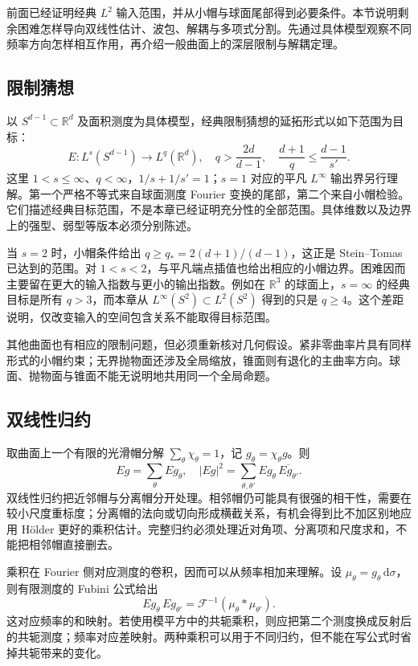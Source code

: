 
前面已经证明经典 \(L^2\) 输入范围，并从小帽与球面尾部得到必要条件。本节说明剩余困难怎样导向双线性估计、波包、解耦与多项式分割。先通过具体模型观察不同频率方向怎样相互作用，再介绍一般曲面上的深层限制与解耦定理。

\subsection{限制猜想}
\label{b2:subsec:230601}

以 \(S^{d-1}\subset\mathbb R^d\) 及面积测度为具体模型，经典限制猜想的延拓形式以如下范围为目标：
\[
 E:L^s(S^{d-1})\longrightarrow L^q(\mathbb R^d),\quad
 q>\frac{2d}{d-1},\quad
 \frac{d+1}{q}\leq\frac{d-1}{s'}.
\]
这里 \(1<s\leq\infty\)、\(q<\infty\)，\(1/s+1/s'=1\)；\(s=1\) 对应的平凡 \(L^\infty\) 输出界另行理解。第一个严格不等式来自球面测度 Fourier 变换的尾部，第二个来自小帽检验。它们描述经典目标范围，不是本章已经证明充分性的全部范围。具体维数以及边界上的强型、弱型等版本必须分别陈述。

\ProseParagraphBreak
当 \(s=2\) 时，小帽条件给出 \(q\geq q_*=2(d+1)/(d-1)\)，这正是 Stein--Tomas 已达到的范围。对 \(1<s<2\)，与平凡端点插值也给出相应的小帽边界。困难因而主要留在更大的输入指数与更小的输出指数。例如在 \(\mathbb R^3\) 的球面上，\(s=\infty\) 的经典目标是所有 \(q>3\)，而本章从 \(L^\infty(S^2)\subset L^2(S^2)\) 得到的只是 \(q\geq4\)。这个差距说明，仅改变输入的空间包含关系不能取得目标范围。

其他曲面也有相应的限制问题，但必须重新核对几何假设。紧非零曲率片具有同样形式的小帽约束；无界抛物面还涉及全局缩放，锥面则有退化的主曲率方向。球面、抛物面与锥面不能无说明地共用同一个全局命题。

\subsection{双线性归约}
\label{b2:subsec:230602}

取曲面上一个有限的光滑帽分解 \(\sum_\theta\chi_\theta=1\)，记 \(g_\theta=\chi_\theta g\)。则
\[
 Eg=\sum_\theta Eg_\theta,\quad
 |Eg|^2=\sum_{\theta,\theta'}
        Eg_\theta\,\overline{Eg_{\theta'}}.
\]
双线性归约把近邻帽与分离帽分开处理。相邻帽仍可能具有很强的相干性，需要在较小尺度重标度；分离帽的法向或切向形成横截关系，有机会得到比不加区别地应用 Hölder 更好的乘积估计。完整归约必须处理近对角项、分离项和尺度求和，不能把相邻帽直接删去。

\ProseParagraphBreak
乘积在 Fourier 侧对应测度的卷积，因而可以从频率相加来理解。设 \(\mu_\theta=g_\theta\,\mathrm d\sigma\)，则有限测度的 Fubini 公式给出
\[
 Eg_\theta\,Eg_{\theta'}
 =\mathcal F^{-1}(\mu_\theta*\mu_{\theta'}).
\]
这对应频率的和映射。若使用模平方中的共轭乘积，则应把第二个测度换成反射后的共轭测度；频率对应差映射。两种乘积可以用于不同归约，但不能在写公式时省掉共轭带来的变化。

